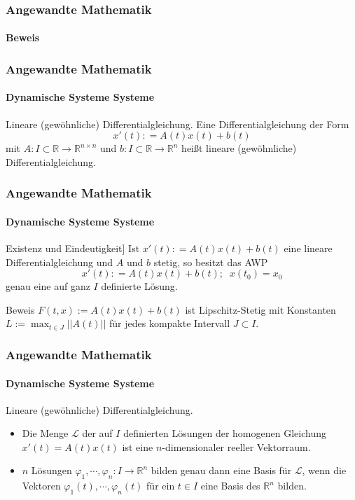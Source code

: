 \documentclass{beamer}
\begin{document}
\begin{frame}
    \frametitle{Angewandte Mathematik}
\framesubtitle{Beweis}

 \end{frame}



\begin{frame}
    \frametitle{Angewandte Mathematik}
\framesubtitle{Dynamische Systeme Systeme}
\begin{block}{Lineare (gewöhnliche) Differentialgleichung.}
Eine Differentialgleichung der Form
$$ x' (t): = A(t) x(t) + b(t)$$
mit $A: I \subset \mathbb{R} \to \mathbb{R}^{n \times n}$ und $b: I \subset \mathbb{R} \to \mathbb{R}^{n}$ heißt lineare (gewöhnliche) Differentialgleichung.
\end{block}

 \end{frame}


\begin{frame}
    \frametitle{Angewandte Mathematik}
\framesubtitle{Dynamische Systeme Systeme}
\begin{block}{Existenz und Eindeutigkeit]}
Ist $x' (t): = A(t) x(t) + b(t)$ eine lineare Differentialgleichung und $A$ und $b$ stetig, so besitzt das AWP 
$$ x' (t): = A(t) x(t) + b(t) ; \; \; x(t_0) = x_0 $$
genau eine auf ganz $I$ definierte Lösung.
\end{block}
\begin{block}{Beweis}
$F(t,x):= A(t) x(t) + b(t)$ ist Lipschitz-Stetig mit Konstanten $L:= \max_{t \in J}|| A(t) ||$ für jedes kompakte Intervall $J \subset I$.
\end{block}
 \end{frame}


\begin{frame}
    \frametitle{Angewandte Mathematik}
\framesubtitle{Dynamische Systeme Systeme}
\begin{block}{Lineare (gewöhnliche) Differentialgleichung.}
\begin{itemize}
\item Die Menge $\mathcal{L}$ der auf $I$ definierten Lösungen der homogenen Gleichung $x'(t) = A(t)x(t)$ ist eine $n$-dimensionaler reeller Vektorraum.
\item $n$ Lösungen $\varphi_1, \cdots, \varphi_n : I \to \mathbb{R}^n$ bilden genau dann eine Basis für $\mathcal{L}$, wenn die Vektoren $\varphi_1(t), \cdots, \varphi_n(t)$ für ein $t \in I$ eine Basis des $\mathbb{R}^n$ bilden.
\end{itemize}
\end{block}

 \end{frame}
\end{document}
